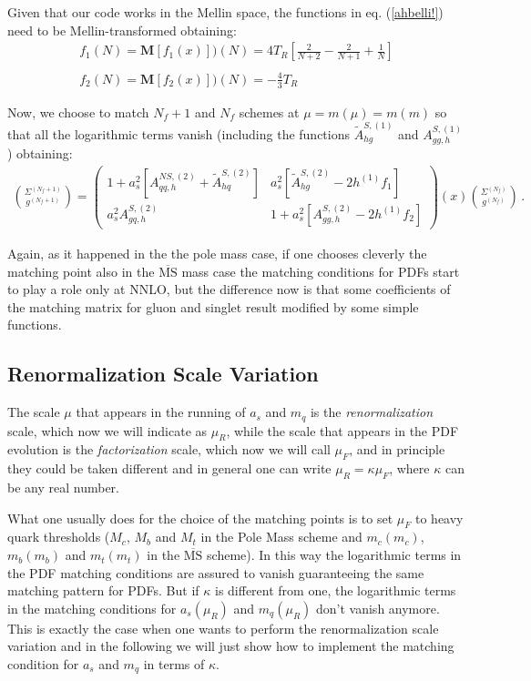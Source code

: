 \documentclass[10pt,a4paper]{article}
\begin{document}
Given that our code works in the Mellin space, the functions in eq. (\ref{ahbelli!}) need to be Mellin-transformed obtaining:
\begin{equation}\label{ahbellissimi!}
\begin{array}{l}
\displaystyle f_1(N) = \mathbf{M}[f_1(x)])(N)= 4 T_R\left[\frac2{N+2}-\frac2{N+1}+\frac1N\right]\\
\\
\displaystyle f_2(N) = \mathbf{M}[f_2(x)])(N)= -\frac43 T_R
\end{array}
\end{equation}

Now, we choose to match $N_f+1$ and $N_f$ schemes at $\mu = m(\mu) = m(m)$ so that all the logarithmic terms vanish (including the functions $\tilde{A}^{S,(1)}_{hg}$ and $A_{gg,h}^{S,(1)}$) obtaining:
\begin{equation}
\begin{array}{c}
\displaystyle {\Sigma^{(N_f+1)}\choose g^{(N_f+1)}}=\begin{pmatrix}1+a_s^2[A_{qq,h}^{N\!S,(2)}+\tilde{A}^{S,(2)}_{hq}] & a_s^2[\tilde{A}^{S,(2)}_{hg}-2h^{(1)}f_1]\\
a_s^2A^{S,(2)}_{gq,h} & 1+a_s^2[A_{gg,h}^{S,(2)}-2h^{(1)}f_2]\end{pmatrix}(x){\Sigma^{(N_f)} \choose g^{(N_f)}}\,.
\end{array}
\end{equation}

Again, as it happened in the the pole mass case, if one chooses cleverly the matching point also in the $\overline{\mbox{MS}}$ mass case the matching conditions for PDFs start to play a role only at NNLO, but the difference now is that some coefficients of the matching matrix for gluon and singlet result modified by some simple functions.

\subsection{Renormalization Scale Variation}

The scale $\mu$ that appears in the running of $a_s$ and $m_q$ is the \textit{renormalization} scale, which now we will indicate as $\mu_R$, while the scale that appears in the PDF evolution is the \textit{factorization} scale, which now we will call $\mu_F$, and in principle they could be taken different and in general one can write $\mu_R = \kappa \mu_F$, where $\kappa$ can be any real number. 

What one usually does for the choice of the matching points is to set $\mu_F$ to heavy quark thresholds ($M_c$, $M_b$ and $M_t$ in the Pole Mass scheme and $m_c(m_c)$, $m_b(m_b)$ and $m_t(m_t)$ in the $\overline{\mbox{MS}}$ scheme). In this way the logarithmic terms in the PDF matching conditions are assured to vanish guaranteeing the same matching pattern for PDFs. But if $\kappa$ is different from one, the logarithmic terms in the matching conditions for $a_s(\mu_R)$ and $m_q(\mu_R)$ don't vanish anymore. This is exactly the case when one wants to perform the renormalization scale variation and in the following we will just show how to implement the matching condition for $a_s$ and $m_q$ in terms of $\kappa$.
\end{document}
